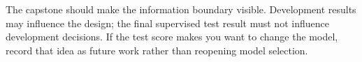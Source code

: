 \begin{keyidea}
The capstone should make the information boundary visible. Development results may influence the design; the final supervised test result must not influence development decisions. If the test score makes you want to change the model, record that idea as future work rather than reopening model selection.
\end{keyidea}
